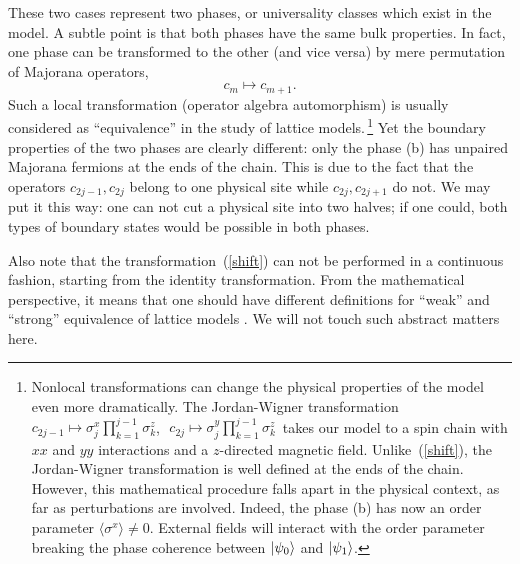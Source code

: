 These two cases represent two phases, or universality classes which exist in
the model. A subtle point is that both phases have the same bulk
properties. In fact, one phase can be transformed to the other (and vice
versa) by mere permutation of Majorana operators,
\begin{equation}\label{shift}
c_m\mapsto c_{m+1}.
\end{equation}
Such a local transformation (operator algebra automorphism) is usually
considered as ``equivalence'' in the study of lattice models.\,\footnote{
Nonlocal transformations can change the physical properties of the model even
more dramatically. The Jordan-Wigner transformation
$c_{2j-1}\mapsto\sigma^x_j\prod_{k=1}^{j-1}\sigma^z_k$,\,\,
$c_{2j}\mapsto\sigma^y_j\prod_{k=1}^{j-1}\sigma^z_k$\, takes our model to a
spin chain with $xx$ and $yy$ interactions and a $z$-directed magnetic field.
Unlike~(\ref{shift}), the Jordan-Wigner transformation is well defined at the
ends of the chain. However, this mathematical procedure falls apart in the
physical context, as far as perturbations are involved. Indeed, the phase (b)
has now an order parameter $\langle\sigma^x\rangle\not=0$. External fields
will interact with the order parameter breaking the phase coherence between
$|\psi_0\rangle$ and $|\psi_1\rangle$.} Yet the boundary properties of the two
phases are clearly different: only the phase (b) has unpaired Majorana
fermions at the ends of the chain. This is due to the fact that the operators
$c_{2j-1},c_{2j}$ belong to one physical site while $c_{2j},c_{2j+1}$ do
not. We may put it this way: one can not cut a physical site into two halves;
if one could, both types of boundary states would be possible in both
phases.

Also note that the transformation~(\ref{shift}) can not be performed in a
continuous fashion, starting from the identity transformation. From the
mathematical perspective, it means that one should have different definitions
for ``weak'' and ``strong'' equivalence of lattice models . We
will not touch such abstract matters here.

